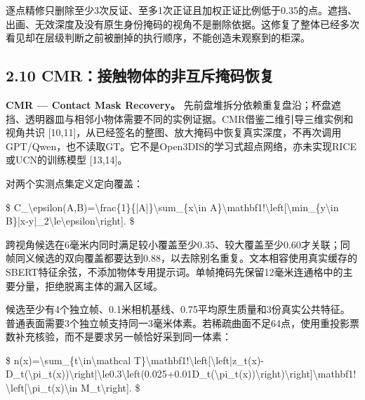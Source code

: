 \documentclass[UTF8,fontset=fandol]{ctexart}
\begin{document}
逐点精修只删除至少3次反证、至多1次正证且加权正证比例低于0.35的点。遮挡、出画、无效深度及没有原生身份掩码的视角不是删除依据。这修复了整体已经多次看见却在层级判断之前被删掉的执行顺序，不能创造未观察到的柜深。



\subsection*{2.10 CMR：接触物体的非互斥掩码恢复}

\textbf{CMR — Contact Mask Recovery。} 先前盘堆拆分依赖重复盘沿；杯盘遮挡、透明器皿与相邻小物体需要不同的实例证据。CMR借鉴二维引导三维实例和视角共识 [10,11]，从已经签名的整图、放大掩码中恢复真实深度，不再次调用GPT/Qwen，也不读取GT。它不是Open3DIS的学习式超点网络，亦未实现RICE或UCN的训练模型 [13,14]。



对两个实测点集定义定向覆盖：



\$
C\_\textbackslash{}epsilon(A,B)=\textbackslash{}frac\{1\}\{|A|\}\textbackslash{}sum\_\{x\textbackslash{}in A\}\textbackslash{}mathbf1!\textbackslash{}left[\textbackslash{}min\_\{y\textbackslash{}in B\}|x-y|\_2\textbackslash{}le\textbackslash{}epsilon\textbackslash{}right].
\$



跨视角候选在6毫米内同时满足较小覆盖至少0.35、较大覆盖至少0.60才关联；同帧同义候选的双向覆盖都要达到0.88，以去除别名重复。文本相容使用真实缓存的SBERT特征余弦，不添加物体专用提示词。单帧掩码先保留12毫米连通格中的主要分量，拒绝脱离主体的漏入区域。



候选至少有4个独立帧、0.1米相机基线、0.75平均原生质量和3份真实公共特征。普通表面需要3个独立帧支持同一3毫米体素。若稀疏曲面不足64点，使用重投影票数补充核验，而不是要求另一帧恰好采到同一体素：



\$
n(x)=\textbackslash{}sum\_\{t\textbackslash{}in\textbackslash{}mathcal T\}\textbackslash{}mathbf1!\textbackslash{}left[\textbackslash{}left|z\_t(x)-D\_t(\textbackslash{}pi\_t(x))\textbackslash{}right|\textbackslash{}le0.3\textbackslash{}left(0.025+0.01D\_t(\textbackslash{}pi\_t(x))\textbackslash{}right)\textbackslash{}right]\textbackslash{}mathbf1!\textbackslash{}left[\textbackslash{}pi\_t(x)\textbackslash{}in M\_t\textbackslash{}right].
\$
\end{document}
